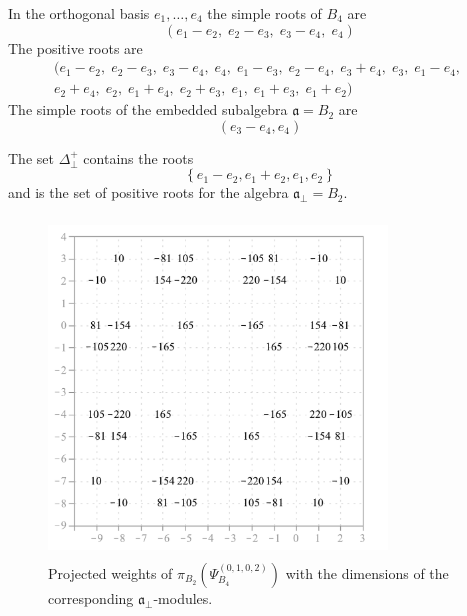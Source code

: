 \documentclass[a4paper,12pt]{article}
\theoremstyle{definition} \newtheorem{Def}{Definition}
\begin{document}
In the orthogonal basis $e_1,\dots,e_4$ the simple roots of $B_4$ are
\begin{equation}
  \label{eq:8}
  (e_1 - e_2,\; e_2 - e_3,\; e_3 - e_4,\; e_4)
\end{equation}
The positive roots are
\begin{multline}
  \label{eq:19}
  (e_1 - e_2,\; e_2 - e_3,\; e_3 - e_4,\; e_4,\; e_1 - e_3,\; e_2 - e_4,\; e_3 + e_4,\; e_3,\; e_1 - e_4,\;\\
    e_2 + e_4,\; e_2,\; e_1 + e_4,\; e_2 + e_3,\; e_1,\; e_1 + e_3,\; e_1 + e_2)
\end{multline}
The simple roots of the embedded subalgebra $\mathfrak{a}=B_2$ are
\begin{equation}
  \label{eq:26}
  (e_3-e_4,e_4)
\end{equation}

The set $\Delta^{+}_{\bot}$ contains the roots
\begin{equation}
  \label{eq:27}
  \left\{e_1-e_2,e_1+e_2,e_1,e_2\right\}
\end{equation}
and is the set of positive roots for the algebra $\mathfrak{a}_{\bot}=B_2$.
\begin{figure}[p]
  \centering
    \includegraphics[width=90mm,height=90mm]{B4_B2_anom_points.pdf}
  \caption{Projected weights of $\pi_{B_2}\left(\Psi^{(0,1,0,2)}_{B_4}\right)$ with the dimensions of the corresponding $\mathfrak{a}_{\bot}$-modules.}
  \label{fig:B4B2anom}
\end{figure}
\end{document}
